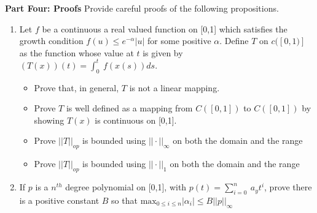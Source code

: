 \documentclass[11pt]{SelfArxOneColBMN}
\begin{document}
\textbf{Part Four: Proofs}
Provide careful proofs of the following propositions.
\begin{enumerate}
  \item Let $f$ be a continuous a real valued function on [0,1] which satisfies the growth condition $f(u) \leq e^{-\alpha}|u|$ for some positive $\alpha$. Define $T$ on $c([0,1)]$ as the function whose value at $t$ is given by $(T(x))(t) = \int_0^t\:f(x(s))ds$.
  \begin{itemize}
    \item Prove that, in general, $T$ is not a linear mapping.
    \item Prove $T$ is well defined as a mapping from $C([0,1])$ to $C([0,1])$ by showing $T(x)$ is continuous on [0,1].
    \item Prove $||T||_{op}$ is bounded using $||\cdot||_{\infty}$ on both the domain and the range
    \item Prove $||T||_{op}$ is bounded using $||\cdot||_1$ on both the domain and the range
  \end{itemize}
  \item If $p$ is a $n^{th}$ degree polynomial on [0,1], with $p(t) = \sum_{i=0}^n\: a_y t^i$, prove there is a positive constant $B$ so that $\text{max}_{0 \leq i \leq n}|\alpha_i| \leq B||p||_{\infty}$
\end{enumerate}
\end{document}
